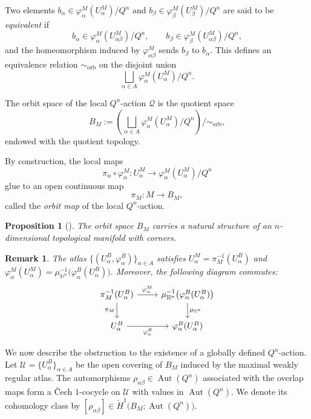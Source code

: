 \documentclass[11pt,a4paper]{article}
\numberwithin{equation}{section}
\newtheorem{remark}[definition]{Remark}
\newtheorem{prop}[definition]{Proposition}
\theoremstyle{named}
\begin{document}
Two elements $b_\alpha\in\varphi_\alpha^M(U_\alpha^M)/Q^n$ and $b_\beta\in\varphi_\beta^M(U_\beta^M)/Q^n$
are said to be \emph{equivalent} if
\[
b_\alpha\in\varphi_\alpha^M(U_{\alpha\beta}^M)/Q^n,
\qquad
b_\beta\in\varphi_\beta^M(U_{\alpha\beta}^M)/Q^n,
\]
and the homeomorphism induced by \(\varphi_{\alpha\beta}^M\) sends
\(b_\beta\) to \(b_\alpha\). This defines an equivalence relation \(\sim_{\mathrm{orb}}\) on  the disjoint union
\[
\bigsqcup_{\alpha\in A}
\varphi_\alpha^M(U_\alpha^M)/Q^n.
\]

\begin{definition}
The orbit space of the local \(Q^n\)-action \(\mathcal Q\) is the quotient space
\[
B_M
:=
\left(
\bigsqcup_{\alpha\in A}
\varphi_\alpha^M(U_\alpha^M)/Q^n
\right)\big/\sim_{\mathrm{orb}},
\]
endowed with the quotient topology.
\end{definition}

By construction, the local maps
\[
\pi_\alpha\circ\varphi_\alpha^M:
U_\alpha^M
\longrightarrow
\varphi_\alpha^M(U_\alpha^M)/Q^n
\]
glue to an open continuous map
\[
\pi_M:M\longrightarrow B_M,
\]
called the \emph{orbit map} of the local \(Q^n\)-action.

\begin{prop}[{\cite[Proposition~2.7]{bg25}}]
\label{prop:orbit-space-corners}
The orbit space \(B_M\) carries a natural structure of an \(n\)-dimensional topological manifold with corners.
\end{prop}


\begin{remark}\label{rem:orbit-atlas}
The atlas $\lbrace
(U_\alpha^B,\varphi_\alpha^B)
\rbrace_{\alpha\in A}$
satisfies $U_\alpha^M=\pi_M^{-1}(U_\alpha^B)$
and \(\varphi_\alpha^M(U_\alpha^M) = \mu_{\mathbb H^n}^{-1} \bigl(\varphi_\alpha^B(U_\alpha^B)\bigr).\) Moreover, the following diagram commutes:
\[
\begin{tikzcd}
\pi_M^{-1}(U_\alpha^B)
\arrow[r, "\varphi_\alpha^M"]
\arrow[d, "\pi_M"']
&
\mu_{\mathbb H^n}^{-1}
\bigl(\varphi_\alpha^B(U_\alpha^B)\bigr)
\arrow[d, "\mu_{\mathbb H^n}"]
\\
U_\alpha^B
\arrow[r, "\varphi_\alpha^B"']
&
\varphi_\alpha^B(U_\alpha^B)
\end{tikzcd}
\]
\end{remark}

\noindent We now describe the obstruction to the existence of a globally defined \(Q^n\)-action. Let $\mathcal U
=\{U_\alpha^B\}_{\alpha\in A}$
be the open covering of \(B_M\) induced by the maximal weakly regular atlas. The automorphisms $\rho_{\alpha\beta}\in\operatorname{Aut}(Q^n)$
associated with the overlap maps form a Čech \(1\)-cocycle on \(\mathcal U\) with values in \(\operatorname{Aut}(Q^n)\). We denote its cohomology class by $[\rho_{\alpha\beta}]
\in
\check H^1
\bigl(B_M;\operatorname{Aut}(Q^n)\bigr)$.
\end{document}
